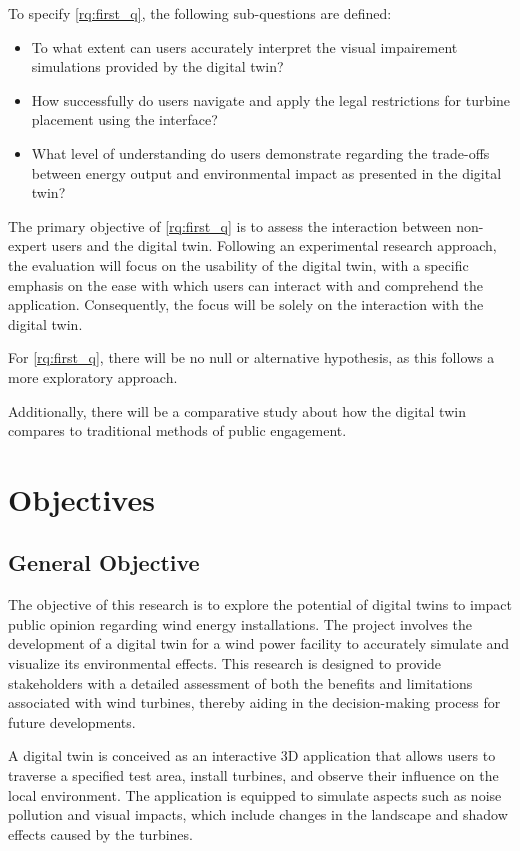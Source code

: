 \documentclass[11pt, titlepage, a4paper]{scrartcl}
\begin{document}
\begin{linenumbers}
    To specify \ref{rq:first_q}, the following sub-questions are defined:

    \begin{itemize}[label={--}]
        \item To what extent can users accurately interpret the visual impairement simulations provided by the digital twin?
        \item How successfully do users navigate and apply the legal restrictions for turbine placement using the interface?
        \item What level of understanding do users demonstrate regarding the trade-offs between energy output and environmental impact as presented in the digital twin?
    \end{itemize}

    The primary objective of \ref{rq:first_q} is to assess the interaction between non-expert users and the digital twin. Following an experimental research approach, the evaluation will focus on the usability of the digital twin, with a specific emphasis on the ease with which users can interact with and comprehend the application. Consequently, the focus will be solely on the interaction with the digital twin.

    For \ref{rq:first_q}, there will be no null or alternative hypothesis, as this follows a more exploratory approach.

    Additionally, there will be a comparative study about how the digital twin compares to traditional methods of public engagement.


    \section{Objectives}
    \subsection{General Objective}
    The objective of this research is to explore the potential of digital twins to impact public opinion regarding wind energy installations. The project involves the development of a digital twin for a wind power facility to accurately simulate and visualize its environmental effects. This research is designed to provide stakeholders with a detailed assessment of both the benefits and limitations associated with wind turbines, thereby aiding in the decision-making process for future developments.

    A digital twin is conceived as an interactive 3D application that allows users to traverse a specified test area, install turbines, and observe their influence on the local environment. The application is equipped to simulate aspects such as noise pollution and visual impacts, which include changes in the landscape and shadow effects caused by the turbines.


\end{linenumbers}
\end{document}
